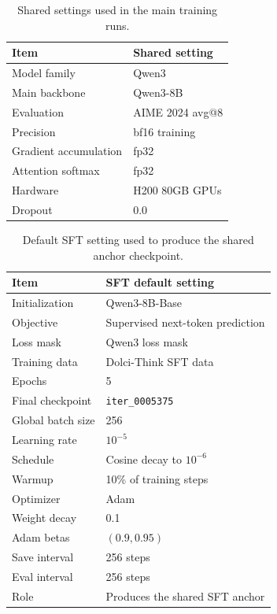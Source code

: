 \documentclass{llmxive}
\providecommand{\arraystretch}{1.05}
\begin{document}
\begin{table}[!htbp]
\centering
\small
\setlength{\tabcolsep}{4pt}
\renewcommand{\arraystretch}{1.08}
\begin{tabularx}{\linewidth}{@{}lX@{}}
\toprule
\textbf{Item} & \textbf{Shared setting} \\
\midrule
Model family & Qwen3 \\
Main backbone & Qwen3-8B \\
Evaluation & AIME 2024 avg@8 \\
Precision & bf16 training \\
Gradient accumulation & fp32 \\
Attention softmax & fp32 \\
Hardware & H200 80GB GPUs \\
Dropout & 0.0 \\
\bottomrule
\end{tabularx}
\caption{Shared settings used in the main training runs.}
\label{tab:shared-training-setup}
\end{table}

\begin{table}[!htbp]
\centering
\small
\setlength{\tabcolsep}{4pt}
\renewcommand{\arraystretch}{1.08}
\begin{tabularx}{\linewidth}{@{}lX@{}}
\toprule
\textbf{Item} & \textbf{SFT default setting} \\
\midrule
Initialization & Qwen3-8B-Base \\
Objective & Supervised next-token prediction \\
Loss mask & Qwen3 loss mask \\
Training data & Dolci-Think SFT data\\
Epochs & 5 \\
Final checkpoint & \texttt{iter\_0005375} \\
Global batch size & 256 \\
Learning rate & $10^{-5}$ \\
Schedule & Cosine decay to $10^{-6}$ \\
Warmup & 10\% of training steps \\
Optimizer & Adam \\
Weight decay & 0.1 \\
Adam betas & $(0.9,0.95)$ \\
Save interval & 256 steps \\
Eval interval & 256 steps \\
Role & Produces the shared SFT anchor \\
\bottomrule
\end{tabularx}
\caption{Default SFT setting used to produce the shared anchor checkpoint.}
\label{tab:sft-default-setting}
\end{table}
\end{document}
